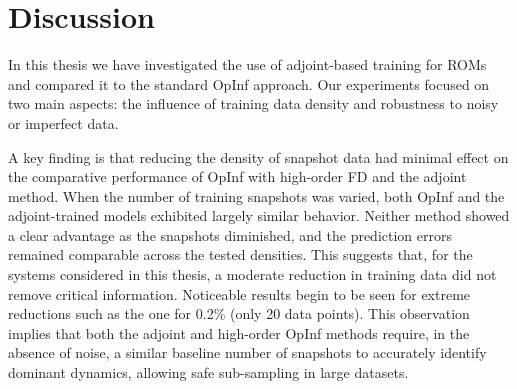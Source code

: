 
\chapter{Discussion}
\label{chap:discussion}
\vspace{-1.3cm}

In this thesis we have investigated the use of adjoint-based training for ROMs and compared it to the standard OpInf approach. Our experiments focused on two main aspects: the influence of training data density and robustness to noisy or imperfect data.

A key finding is that reducing the density of snapshot data had minimal effect on the comparative performance of OpInf with high-order FD and the adjoint method. When the number of training snapshots was varied, both OpInf and the adjoint-trained models exhibited largely similar behavior. Neither method showed a clear advantage as the snapshots diminished, and the prediction errors remained comparable across the tested densities. This suggests that, for the systems considered in this thesis, a moderate reduction in training data did not remove critical information. Noticeable results begin to be seen for extreme reductions such as the one for 0.2\% (only 20 data points). This observation implies that both the adjoint and high-order OpInf methods require, in the absence of noise, a similar baseline number of snapshots to accurately identify dominant dynamics, allowing safe sub-sampling in large datasets.


